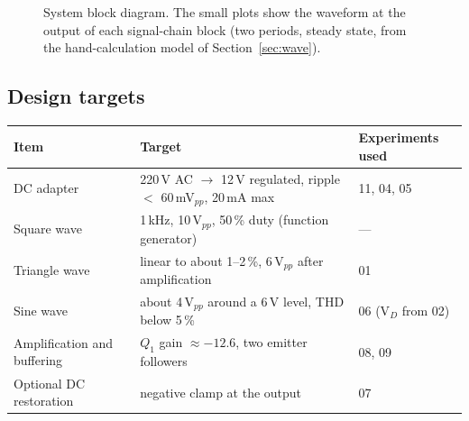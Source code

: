 \begin{figure}[H]
{}
\caption{System block diagram. The small plots show the waveform at the output of each signal-chain block (two periods, steady state, from the hand-calculation model of Section~\ref{sec:wave}).}
\label{fig:blocks}
\end{figure}

\subsection{Design targets}
\begin{center}
\small
\begin{tabularx}{\textwidth}{@{}lXl@{}}
\toprule
Item & Target & Experiments used \\
\midrule
DC adapter & 220\,V AC $\rightarrow$ 12\,V regulated, ripple $<$ 60\,mV$_{pp}$, 20\,mA max & 11, 04, 05 \\
Square wave & 1\,kHz, 10\,V$_{pp}$, 50\,\% duty (function generator) & --- \\
Triangle wave & linear to about 1--2\,\%, 6\,V$_{pp}$ after amplification & 01 \\
Sine wave & about 4\,V$_{pp}$ around a 6\,V level, THD below 5\,\% & 06 (V$_D$ from 02) \\
Amplification and buffering & $Q_1$ gain $\approx-12.6$, two emitter followers & 08, 09 \\
Optional DC restoration & negative clamp at the output & 07 \\
\bottomrule
\end{tabularx}
\end{center}

